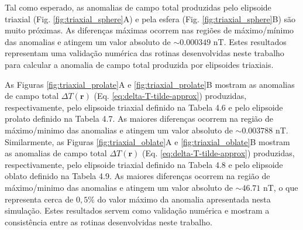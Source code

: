 Tal como esperado, as anomalias de campo total produzidas pelo elipsoide triaxial (Fig. \ref{fig:triaxial_sphere}A) e pela esfera (Fig. \ref{fig:triaxial_sphere}B) são muito próximas. As diferenças máximas ocorrem nas regiões de máximo/mínimo das anomalias e atingem um valor absoluto de $\sim 0.000349$ nT. Estes resultados representam uma validação numérica das rotinas desenvolvidas neste trabalho para calcular a anomalia de campo total produzida por elipsoides triaxiais.

As Figuras \ref{fig:triaxial_prolate}A e \ref{fig:triaxial_prolate}B mostram as anomalias de campo total $\Delta T (\mathbf{r})$ (Eq. \ref{eq:delta-T-tilde-approx}) produzidas, respectivamente, pelo elipsoide triaxial definido na Tabela 4.6 e pelo elipsoide prolato definido na Tabela 4.7. As maiores diferenças ocorrem na região de máximo/minimo das anomalias e atingem um valor absoluto de $\sim 0.003788$ nT. Similarmente, as Figuras \ref{fig:triaxial_oblate}A e \ref{fig:triaxial_oblate}B mostram as anomalias de campo total $\Delta T (\mathbf{r})$ (Eq. \ref{eq:delta-T-tilde-approx}) produzidas, respectivamente, pelo elipsoide triaxial definido na Tabela 4.8 e pelo elipsoide oblato definido na Tabela 4.9. As maiores diferenças ocorrem na região de máximo/minimo das anomalias e atingem um valor absoluto de $\sim 46.71$ nT, o que representa cerca de $0,5\%$ do valor máximo da anomalia apresentada nesta simulação. Estes resultados servem como validação numérica e mostram a consistência entre as rotinas desenvolvidas neste trabalho.

